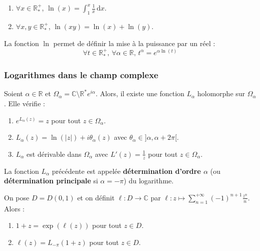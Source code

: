 	\begin{theorem}
		\begin{enumerate}[label=(\roman*)]
			\item $\forall x \in \mathbb{R}_*^+$, $\ln(x) = \int_1^x \frac{1}{x} \, \mathrm{d}x$.
			\item $\forall x, y \in \mathbb{R}_*^+$, $\ln(xy) = \ln(x) + \ln(y)$.
		\end{enumerate}
	\end{theorem}

	\begin{remark}
		La fonction $\ln$ permet de définir la mise à la puissance par un réel :
		\[ \forall t \in \mathbb{R}^+_*, \, \forall \alpha \in \mathbb{R}, \, t^\alpha = e^{\alpha \ln(t)} \]
	\end{remark}

	\subsubsection{Logarithmes dans le champ complexe}

	\reference[QUE]{81}

	\begin{theorem}
		Soient $\alpha \in \mathbb{R}$ et $\Omega_\alpha = \mathbb{C} \setminus \mathbb{R}^* e^{i\alpha}$. Alors, il existe une fonction $L_\alpha$ holomorphe sur $\Omega_\alpha$. Elle vérifie :
		\begin{enumerate}[label=(\roman*)]
			\item $e^{L_\alpha(z)} = z$ pour tout $z \in \Omega_\alpha$.
			\item $L_\alpha(z) = \ln(\vert z \vert) + i\theta_\alpha(z)$ avec $\theta_\alpha \in ]\alpha, \alpha + 2\pi[$.
			\item $L_\alpha$ est dérivable dans $\Omega_\alpha$ avec $L'(z) = \frac{1}{z}$ pour tout $z \in \Omega_\alpha$.
		\end{enumerate}
	\end{theorem}

	\begin{definition}
		La fonction $L_\alpha$ précédente est appelée \textbf{détermination d'ordre $\alpha$} (ou \textbf{détermination principale} si $\alpha = -\pi$) du logarithme.
	\end{definition}

	\begin{theorem}
		On pose $D = D(0,1)$ et on définit $\ell : D \rightarrow \mathbb{C}$ par $\ell : z \mapsto \sum_{n=1}^{+\infty} (-1)^{n+1} \frac{z^n}{n}$. Alors :
		\begin{enumerate}[label=(\roman*)]
			\item $1 + z = \exp(\ell(z))$ pour tout $z \in D$.
			\item $\ell(z) = L_{-\pi}(1+z)$ pour tout $z \in D$.
		\end{enumerate}
	\end{theorem}


